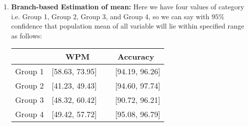 \documentclass[12pt,a4paper]{report}
\begin{document}
\begin{enumerate}[label=\textbf{\arabic*})]
\begin{enumerate}
        \item \textbf{Branch-based Estimation of mean:}
        Here we have four values of category i.e. Group 1, Group 2, Group 3, and Group 4, so we can say with $95\%$ confidence that population mean of all variable will lie within specified range as follows:
    \begin{center}
    \begin{tabular}{ |c|c|c|}
      \hline
       & WPM & Accuracy \\
      \hline
      Group 1 & [58.63, 73.95] \ & \ [94.19, 96.26] \\ 
      \hline
      Group 2 & [41.23, 49.43] \ & \ [94.60, 97.74] \\
      \hline
      Group 3 & [48.32, 60.42] \ & \ [90.72, 96.21] \\
      \hline
      Group 4 & [49.42, 57.72] \ & \ [95.08, 96.79] \\
      \hline
    \end{tabular}
    \end{center}
    \vspace{1.5mm}
    \end{enumerate}
\newpage


\end{enumerate}
\end{document}
